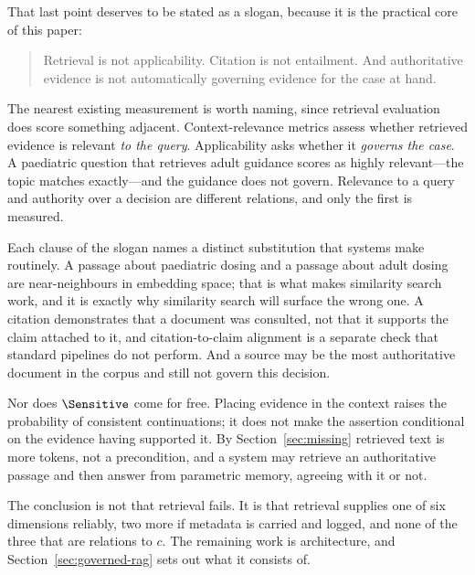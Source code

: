 That last point deserves to be stated as a slogan, because it is the practical core
of this paper:

\begin{quote}
Retrieval is not applicability. Citation is not entailment. And authoritative
evidence is not automatically governing evidence for the case at hand.
\end{quote}

The nearest existing measurement is worth naming, since retrieval evaluation does
score something adjacent. Context-relevance metrics assess whether retrieved evidence
is relevant \emph{to the query}. Applicability asks whether it \emph{governs the
case}. A paediatric question that retrieves adult guidance scores as highly
relevant---the topic matches exactly---and the guidance does not govern. Relevance to a
query and authority over a decision are different relations, and only the first is
measured.

Each clause of the slogan names a distinct substitution that systems make routinely. A
passage
about paediatric dosing and a passage about adult dosing are near-neighbours in
embedding space; that is what makes similarity search work, and it is exactly why
similarity search will surface the wrong one. A citation demonstrates that a
document was consulted, not that it supports the claim attached to it, and
citation-to-claim alignment is a separate check that standard pipelines do not
perform. And a source may be the most authoritative document in the corpus and
still not govern this decision.

Nor does $\Sensitive$ come for free. Placing evidence in the context raises the
probability of consistent continuations; it does not make the assertion conditional
on the evidence having supported it. By Section~\ref{sec:missing} retrieved text is
more tokens, not a precondition, and a system may retrieve an authoritative passage
and then answer from parametric memory, agreeing with it or not.

The conclusion is not that retrieval fails. It is that retrieval supplies one of
six dimensions reliably, two more if metadata is carried and logged, and none of
the three that are relations to $c$. The remaining work is architecture, and
Section~\ref{sec:governed-rag} sets out what it consists of.
